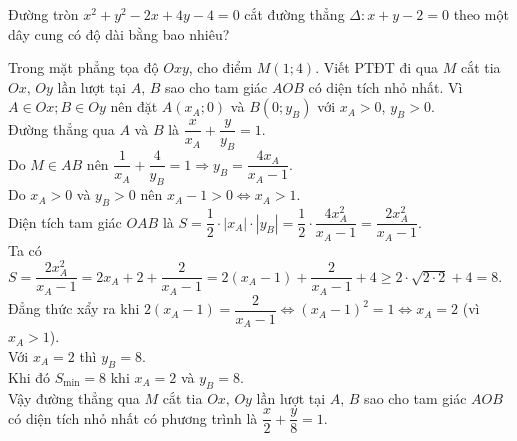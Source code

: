 	\begin{bt}%
		Đường tròn $x^2+y^2-2x+4y-4=0$ cắt đường thẳng $\Delta\colon x+y-2=0$ theo một dây cung có độ dài bằng bao nhiêu?
		
	\end{bt}
	\begin{bt}%
		Trong mặt phẳng tọa độ $Oxy$, cho điểm ${M}(1 ;   4)$. Viết PTĐT đi qua ${M}$ cắt tia $Ox,\, Oy$ lần lượt tại ${A}, \, {B}$ sao cho tam giác ${AOB}$ có diện tích nhỏ nhất.
		\loigiai
		{
			Vì $A \in Ox;  B\in Oy$ nên đặt $A(x_A;  0)$ và $B(0; y_B)$ với $x_A>0$, $y_B>0$.\\
			Đường thẳng qua $A$ và $B$ là $\dfrac{x}{x_A}+\dfrac{y}{y_B}=1$.\\
			Do $M\in AB$ nên $\dfrac{1}{x_A}+\dfrac{4}{y_B}=1\Rightarrow y_B=\dfrac{4x_A}{x_A-1}$.\\
			Do $x_A>0$ và $y_B>0$ nên $x_A-1>0 \Leftrightarrow x_A>1$. \\
			Diện tích tam giác $OAB$ là $S=\dfrac{1}{2}\cdot|x_A|\cdot|y_B|=\dfrac{1}{2}\cdot\dfrac{4x_A^2}{x_A-1}=\dfrac{2x_A^2}{x_A-1}$.\\
			Ta có $S=\dfrac{2x_A^2}{x_A-1}=2x_A+2+\dfrac{2}{x_A-1}=2(x_A-1)+\dfrac{2}{x_A-1}+4\geq2\cdot\sqrt{2\cdot 2}+4=8$. \\
			Đẳng thức xẩy ra khi $2\left(x_A-1\right)=\dfrac{2}{x_A-1} \Leftrightarrow \left(x_A-1\right)^2=1 \Leftrightarrow x_A=2$ (vì $x_A>1$). \\
			Với $x_A=2$ thì $y_B=8$. \\
			Khi đó $S_{\min}=8$ khi $x_A=2$ và $ y_B=8$. \\
			Vậy đường thẳng qua $M$ cắt tia $Ox,\, Oy$ lần lượt tại ${A}, \, {B}$ sao cho tam giác ${AOB}$ có diện tích nhỏ nhất có phương trình là $\dfrac{x}{2}+\dfrac{y}{8}=1$.
		}
	\end{bt}
